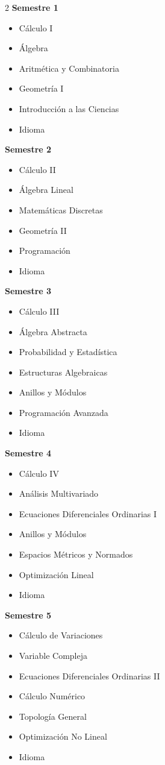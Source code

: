 \documentclass[12pt,a4paper]{article}
\begin{document}
	\begin{multicols}{2}
		\textbf{Semestre 1}
		\begin{itemize}
			\item Cálculo I
			\item Álgebra
			\item Aritmética y Combinatoria
			\item Geometría I
			\item Introducción a las Ciencias
			\item Idioma
		\end{itemize}
		
		\textbf{Semestre 2}
		\begin{itemize}
			\item Cálculo II
			\item Álgebra Lineal
			\item Matemáticas Discretas
			\item Geometría II
			\item Programación
			\item Idioma
		\end{itemize}
		
		\textbf{Semestre 3}
		\begin{itemize}
			\item Cálculo III
			\item Álgebra Abstracta
			\item Probabilidad y Estadística
			\item Estructuras Algebraicas
			\item Anillos y Módulos
			\item Programación Avanzada
			\item Idioma
		\end{itemize}
		
		\textbf{Semestre 4}
		\begin{itemize}
			\item Cálculo IV
			\item Análisis Multivariado
			\item Ecuaciones Diferenciales Ordinarias I
			\item Anillos y Módulos
			\item Espacios Métricos y Normados
			\item Optimización Lineal
			\item Idioma
		\end{itemize}
		
		\textbf{Semestre 5}
		\begin{itemize}
			\item Cálculo de Variaciones
			\item Variable Compleja
			\item Ecuaciones Diferenciales Ordinarias II
			\item Cálculo Numérico
			\item Topología General
			\item Optimización No Lineal
			\item Idioma
		\end{itemize}
		

\end{multicols}
\end{document}
